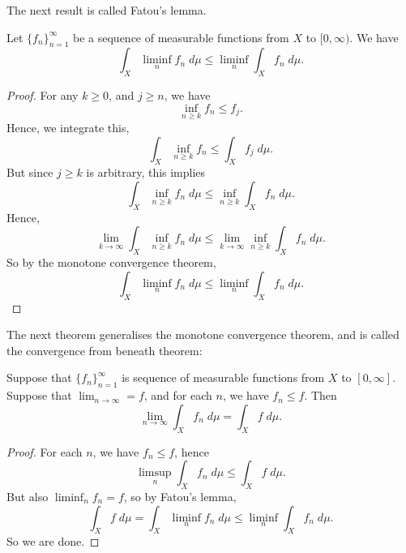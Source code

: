 \documentclass{owmaths}
\begin{document}
  
The next result is called Fatou's lemma. 
\begin{lemma}
    Let $\{f_n\}_{n=1}^\infty$ be a sequence of measurable functions from $X$ to $[0,\infty)$. We have
    \begin{equation*}
        \int_X \liminf_{n} f_n\;d\mu \leq \liminf_{n} \int_X f_n\;d\mu.
    \end{equation*}
\end{lemma}
\begin{proof}
    For any $k \geq 0$, and $j\geq n$, we have
    \begin{equation*}
        \inf_{n\geq k} f_n \leq f_j.
    \end{equation*}
    Hence, we integrate this,
    \begin{equation*}
        \int_X \inf_{n\geq k} f_n \leq \int_{X} f_j\;d\mu.
    \end{equation*}
    But since $j \geq k$ is arbitrary, this implies
    \begin{equation*}
        \int_X \inf_{n\geq k} f_n\;d\mu \leq \inf_{n\geq k} \int_X f_n \;d\mu.
    \end{equation*}
    Hence,
    \begin{equation*}
        \lim_{k\rightarrow\infty} \int_X \inf_{n\geq k} f_n\;d\mu \leq \lim_{k\rightarrow\infty} \inf_{n\geq k} \int_X f_n\;d\mu.
    \end{equation*}
    So by the monotone convergence theorem,
    \begin{equation*}
        \int_X \liminf_n f_n\;d\mu \leq \liminf_n \int_X f_n\;d\mu.
    \end{equation*}
\end{proof}
  
The next theorem generalises the monotone convergence theorem, and is called
the convergence from beneath theorem:
\begin{proposition}
    Suppose that $\{f_n\}_{n=1}^\infty$ is sequence of measurable
    functions from $X$ to $[0,\infty]$. Suppose that $\lim_{n\rightarrow\infty} = f$,
    and for each $n$, we have $f_n \leq f$. Then
    \begin{equation*}
        \lim_{n\rightarrow\infty} \int_X f_n\;d\mu = \int_X f\;d\mu.
    \end{equation*}
\end{proposition}
\begin{proof}
    For each $n$, we have $f_n \leq f$, hence
    \begin{equation*}
        \limsup_n \int_X f_n \;d\mu \leq \int_X f\;d\mu.
    \end{equation*}
    But also $\liminf_n f_n = f$, so by Fatou's lemma,
    \begin{equation*}
        \int_X f\;d\mu = \int_X \liminf_n f_n\;d\mu \leq \liminf_n \int_X f_n\;d\mu.
    \end{equation*}
    So we are done.
\end{proof}
\end{document}
